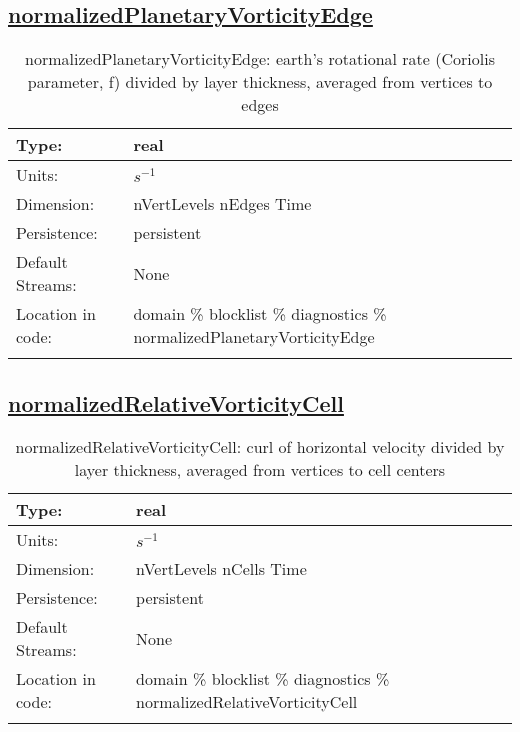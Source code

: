 \subsection[normalizedPlanetaryVorticityEdge]{\hyperref[sec:var_tab_diagnostics]{normalizedPlanetaryVorticityEdge}}
\label{subsec:var_sec_diagnostics_normalizedPlanetaryVorticityEdge}
\begin{center}
\begin{longtable}{| p{2.0in} | p{4.0in} |}
        \hline 
        Type: & real \\
        \hline 
        Units: & $s^{-1}$ \\
        \hline 
        Dimension: & nVertLevels nEdges Time \\
        \hline 
        Persistence: & persistent \\
        \hline 
		 Default Streams: & None \\
        \hline 
		 Location in code: & domain \% blocklist \% diagnostics \% normalizedPlanetaryVorticityEdge \\
		 \hline 
    \caption{normalizedPlanetaryVorticityEdge: earth's rotational rate (Coriolis parameter, f) divided by layer thickness, averaged from vertices to edges}
\end{longtable}
\end{center}
\subsection[normalizedRelativeVorticityCell]{\hyperref[sec:var_tab_diagnostics]{normalizedRelativeVorticityCell}}
\label{subsec:var_sec_diagnostics_normalizedRelativeVorticityCell}
\begin{center}
\begin{longtable}{| p{2.0in} | p{4.0in} |}
        \hline 
        Type: & real \\
        \hline 
        Units: & $s^{-1}$ \\
        \hline 
        Dimension: & nVertLevels nCells Time \\
        \hline 
        Persistence: & persistent \\
        \hline 
		 Default Streams: & None \\
        \hline 
		 Location in code: & domain \% blocklist \% diagnostics \% normalizedRelativeVorticityCell \\
		 \hline 
    \caption{normalizedRelativeVorticityCell: curl of horizontal velocity divided by layer thickness, averaged from vertices to cell centers}
\end{longtable}
\end{center}
